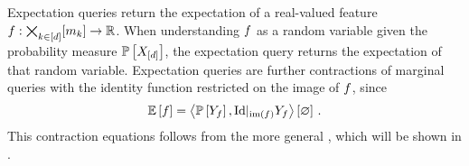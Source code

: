 Expectation queries return the expectation of a real-valued feature $f : \bigtimes_{k\in[d]}[m_{k}]\rightarrow\mathbb{R}$.
When understanding $f$ as a random variable given the probability measure $\mathbb{P}\left[X_{[d]}\right]$, the expectation query returns the expectation of that random variable.
Expectation queries are further contractions of marginal queries with the identity function restricted on the image of $f$, since
\begin{align*}
    \mathbb{E}\left[f\right]
    = \left\langle \mathbb{P}\left[Y_{f}\right],{\mathrm{Id}}|_{\mathrm{im}\left(f\right)}{Y_{f}} \right\rangle \left[ \varnothing \right] \, .
\end{align*}
This contraction equations follows from the more general , which will be shown in .




